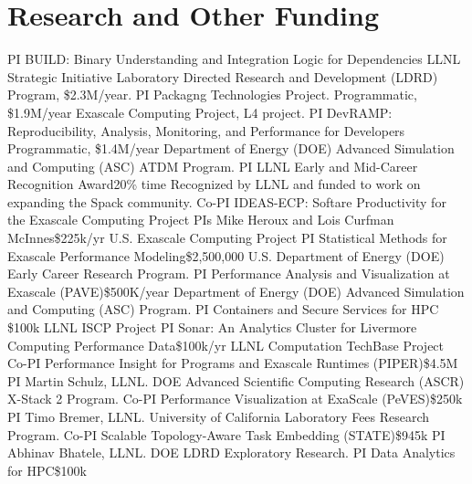 \section{Research and Other Funding}
		{PI}
		{BUILD: Binary Understanding and Integration Logic for Dependencies}
        {}{LLNL Strategic Initiative}
		{Laboratory Directed Research and Development (LDRD) Program, \$2.3M/year.}
		{PI}
		{Packagng Technologies Project.}
        {}{Programmatic, \$1.9M/year}
		{Exascale Computing Project, L4 project.}
		{PI}
		{DevRAMP: Reproducibility, Analysis, Monitoring, and Performance for Developers}
        {}{Programmatic, \$1.4M/year}
		{Department of Energy (DOE) Advanced Simulation and Computing (ASC) ATDM Program.}
		{PI}
		{LLNL Early and Mid-Career Recognition Award}{}{20\% time}
		{Recognized by LLNL and funded to work on expanding the Spack community.}
		{Co-PI}
		{IDEAS-ECP: Softare Productivity for the Exascale Computing Project}
        {PIs Mike Heroux and Lois Curfman McInnes}{\$225k/yr}
		{U.S. Exascale Computing Project}
		{PI}
		{Statistical Methods for Exascale Performance Modeling}{}{\$2,500,000}
		{U.S. Department of Energy (DOE) Early Career Research Program.}
		{PI}
		{Performance Analysis and Visualization at Exascale (PAVE)}{}{\$500K/year}
		{%
		 Department of Energy (DOE) Advanced Simulation and Computing (ASC) Program.}
		{PI}
		{Containers and Secure Services for HPC}
        {}{\$100k}
		{LLNL ISCP Project}
		{PI}
		{Sonar: An Analytics Cluster for Livermore Computing Performance Data}{}{\$100k/yr}
		{LLNL Computation TechBase Project}
		{Co-PI}
		{Performance Insight for Programs and Exascale Runtimes (PIPER)}{}{\$4.5M}
		{PI Martin Schulz, LLNL. DOE Advanced Scientific Computing Research (ASCR)
		 X-Stack 2 Program.}
		{Co-PI}
		{Performance Visualization at ExaScale (PeVES)}{}{\$250k}
		{PI Timo Bremer, LLNL. University of California Laboratory Fees Research Program.}
		{Co-PI}
		{Scalable Topology-Aware Task Embedding (STATE)}{}{\$945k}
		{PI Abhinav Bhatele, LLNL. DOE LDRD Exploratory Research.}
		{PI}
		{Data Analytics for HPC}{}{\$100k}
		{}
